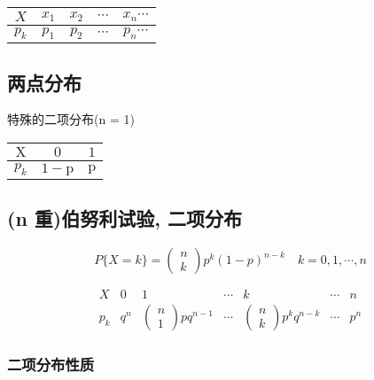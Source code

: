 \begin{center}
    \begin{tabular}{|c|c|c|c|c|}
    \hline $ {X} $ & $ {x}_{1} $ & $ {x}_{2} $ & $ \cdots $ & $ {x}_{n} \cdots $ \\
    \hline $ {p}_{k} $ & $ {p}_{1} $ & $ {p}_{2} $ & $ \cdots $ & $ {p}_{n} \cdots $ \\
    \hline
    \end{tabular}
\end{center}


\subsection{两点分布}

特殊的二项分布(n = 1)
\begin{center}
   \begin{tabular}{|c|c|c|}
    \hline $ \mathrm{X} $ & $0$ & $1 $\\
    \hline$ p_{k} $ & $ 1-\mathrm{p} $ & $ \mathrm{p} $ \\
    \hline
    \end{tabular}

\subsection{(n 重)伯努利试验, 二项分布} 
\end{center}


$$
P\{X=k\}=\left(\begin{array}{l}
n \\
k
\end{array}\right) p^{k}(1-p)^{n-k} \quad k=0,1, \cdots, n
$$

$$
\begin{array}{c|cccccc}
{X} & {0} & {1} & \cdots & {k} & \cdots & {n} \\
\hline {p}_{{k}} & {q}^{n} & \left(\begin{array}{l}
{n} \\
{1}
\end{array}\right) {p q}^{n-1} & \cdots & \left(\begin{array}{l}
{n} \\
{k}
\end{array}\right) {p}^{k} {q}^{n-k} & \cdots & {p}^{n}
\end{array}
$$

\subsubsection{二项分布性质}

